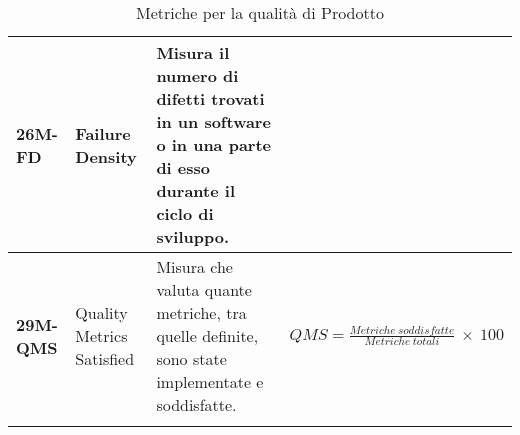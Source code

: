 \begin{longtable}{|>{\centering\arraybackslash}p{}|>{\centering\arraybackslash}p{}|>{\centering\arraybackslash}p{}|>{\centering\arraybackslash}p{}|}
	\hline
	\textbf{26M-FD}  & Failure Density                      & Misura il numero di difetti trovati in un software o in una parte di esso durante il ciclo di sviluppo.                                                                                                 &                                                                                                      \\
	\hline
	\textbf{29M-QMS} & Quality Metrics Satisfied            & Misura che valuta quante metriche, tra quelle definite, sono state implementate e soddisfatte.                                                                                                          & $QMS = \frac{Metriche\: soddisfatte}{Metriche\: totali}\: \times \: 100$                             \\
	\hline
	\caption{Metriche per la qualità di Prodotto}
	\label{table:4}
\end{longtable}
